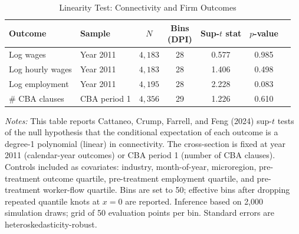 \begin{table}[H]
\centering
\caption{Linearity Test: Connectivity and Firm Outcomes}
\label{tab:linearity_binstest}
\scriptsize
\begin{tabular}{llccccc}
\toprule\toprule
Outcome & Sample & $N$ & \shortstack{Bins\\(DPI)} & \shortstack{Sup-$t$\\stat} & $p$-value \\
\midrule
Log  wages & Year 2011 & $4{,}183$ & 28 & 0.577 & 0.985 \\
Log hourly wages & Year 2011 & $4{,}183$ & 28 & 1.406 & 0.498 \\
Log employment & Year 2011 & $4{,}195$ & 28 & 2.228 &  0.083 \\
\# CBA clauses & CBA period 1 & $4{,}356$ & 29 & 1.226 & 0.610 \\
\bottomrule
\end{tabular}
\begin{minipage}{\linewidth}
\footnotesize\vspace{4pt}
\textit{Notes:} This table reports Cattaneo, Crump, Farrell, and Feng (2024) sup-$t$ tests of the null hypothesis that the conditional expectation of each outcome is a degree-1 polynomial (linear) in connectivity. The cross-section is fixed at year 2011 (calendar-year outcomes) or CBA period 1 (number of CBA clauses). Controls included as covariates: industry, month-of-year, microregion, pre-treatment outcome quartile, pre-treatment employment quartile, and pre-treatment worker-flow quartile. Bins are set to 50; effective bins after dropping repeated quantile knots at $x=0$ are reported. Inference based on 2{,}000 simulation draws; grid of 50 evaluation points per bin. Standard errors are heteroskedasticity-robust.
\end{minipage}
\end{table}
